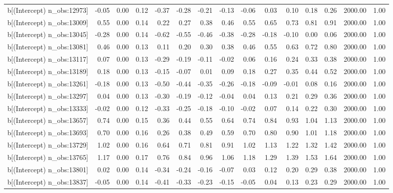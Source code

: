 \begin{table}[ht]
\begin{tabular}{rrrrrrrrrrrrrrr}
  b[(Intercept) n\_obs:12973] & -0.05 & 0.00 & 0.12 & -0.37 & -0.28 & -0.21 & -0.13 & -0.06 & 0.03 & 0.10 & 0.18 & 0.26 & 2000.00 & 1.00 \\ 
  b[(Intercept) n\_obs:13009] & 0.55 & 0.00 & 0.14 & 0.22 & 0.27 & 0.38 & 0.46 & 0.55 & 0.65 & 0.73 & 0.81 & 0.91 & 2000.00 & 1.00 \\ 
  b[(Intercept) n\_obs:13045] & -0.28 & 0.00 & 0.14 & -0.62 & -0.55 & -0.46 & -0.38 & -0.28 & -0.18 & -0.10 & 0.00 & 0.06 & 2000.00 & 1.00 \\ 
  b[(Intercept) n\_obs:13081] & 0.46 & 0.00 & 0.13 & 0.11 & 0.20 & 0.30 & 0.38 & 0.46 & 0.55 & 0.63 & 0.72 & 0.80 & 2000.00 & 1.00 \\ 
  b[(Intercept) n\_obs:13117] & 0.07 & 0.00 & 0.13 & -0.29 & -0.19 & -0.11 & -0.02 & 0.06 & 0.16 & 0.24 & 0.33 & 0.38 & 2000.00 & 1.00 \\ 
  b[(Intercept) n\_obs:13189] & 0.18 & 0.00 & 0.13 & -0.15 & -0.07 & 0.01 & 0.09 & 0.18 & 0.27 & 0.35 & 0.44 & 0.52 & 2000.00 & 1.00 \\ 
  b[(Intercept) n\_obs:13261] & -0.18 & 0.00 & 0.13 & -0.50 & -0.44 & -0.35 & -0.26 & -0.18 & -0.09 & -0.01 & 0.08 & 0.16 & 2000.00 & 1.00 \\ 
  b[(Intercept) n\_obs:13297] & 0.04 & 0.00 & 0.13 & -0.30 & -0.19 & -0.12 & -0.04 & 0.04 & 0.13 & 0.21 & 0.29 & 0.36 & 2000.00 & 1.00 \\ 
  b[(Intercept) n\_obs:13333] & -0.02 & 0.00 & 0.12 & -0.33 & -0.25 & -0.18 & -0.10 & -0.02 & 0.07 & 0.14 & 0.22 & 0.30 & 2000.00 & 1.00 \\ 
  b[(Intercept) n\_obs:13657] & 0.74 & 0.00 & 0.15 & 0.36 & 0.44 & 0.55 & 0.64 & 0.74 & 0.84 & 0.93 & 1.04 & 1.13 & 2000.00 & 1.00 \\ 
  b[(Intercept) n\_obs:13693] & 0.70 & 0.00 & 0.16 & 0.26 & 0.38 & 0.49 & 0.59 & 0.70 & 0.80 & 0.90 & 1.01 & 1.18 & 2000.00 & 1.00 \\ 
  b[(Intercept) n\_obs:13729] & 1.02 & 0.00 & 0.16 & 0.64 & 0.71 & 0.81 & 0.91 & 1.02 & 1.13 & 1.22 & 1.32 & 1.42 & 2000.00 & 1.00 \\ 
  b[(Intercept) n\_obs:13765] & 1.17 & 0.00 & 0.17 & 0.76 & 0.84 & 0.96 & 1.06 & 1.18 & 1.29 & 1.39 & 1.53 & 1.64 & 2000.00 & 1.00 \\ 
  b[(Intercept) n\_obs:13801] & 0.02 & 0.00 & 0.14 & -0.34 & -0.24 & -0.16 & -0.07 & 0.03 & 0.12 & 0.20 & 0.29 & 0.38 & 2000.00 & 1.00 \\ 
  b[(Intercept) n\_obs:13837] & -0.05 & 0.00 & 0.14 & -0.41 & -0.33 & -0.23 & -0.15 & -0.05 & 0.04 & 0.13 & 0.23 & 0.29 & 2000.00 & 1.00 \\ 

\end{tabular}
\end{table}
